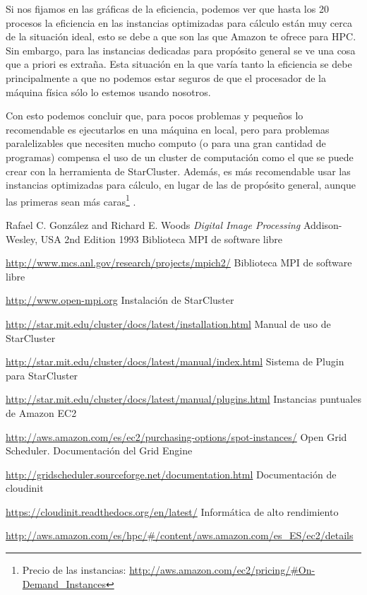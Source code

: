 \documentclass{article}
\begin{document}
	Si nos fijamos en las gráficas de la eficiencia, podemos ver que hasta los 20 procesos la eficiencia en las instancias optimizadas para cálculo están muy cerca de la situación ideal, esto se debe a que son las que Amazon te ofrece para HPC\cite{AmazonHPC}. Sin embargo, para las instancias dedicadas para propósito general se ve una cosa que a priori es extraña. Esta situación en la que varía tanto la eficiencia se debe principalmente a que no podemos estar seguros de que el procesador de la máquina física sólo lo estemos usando nosotros.
	
	Con esto podemos concluir que, para pocos problemas y pequeños lo recomendable es ejecutarlos en una máquina en local, pero para problemas paralelizables que necesiten mucho computo (o para una gran cantidad de programas) compensa el uso de un cluster de computación como el que se puede crear con la herramienta de StarCluster. Además, es más recomendable usar las instancias optimizadas para cálculo, en lugar de las de propósito general, aunque las primeras sean más caras\footnote{Precio de las instancias: \url{http://aws.amazon.com/ec2/pricing/\#On-Demand\_Instances}} .

\clearpage
{\setlength{\parskip}{0mm} \listoftables } %
{\setlength{\parskip}{0mm} \listoffigures} %

\clearpage

\renewcommand{\bibname}{Referencias}
\begin{thebibliography}{99}
Rafael C. González and Richard E. Woods
\emph{Digital Image Processing}
Addison-Wesley, USA
2nd Edition
1993
Biblioteca MPI de software libre

\url{http://www.mcs.anl.gov/research/projects/mpich2/}
Biblioteca MPI de software libre

\url{http://www.open-mpi.org}
Instalación de StarCluster

\url{http://star.mit.edu/cluster/docs/latest/installation.html}
Manual de uso de StarCluster

\url{http://star.mit.edu/cluster/docs/latest/manual/index.html}
Sistema de Plugin para StarCluster

\url{http://star.mit.edu/cluster/docs/latest/manual/plugins.html}
Instancias puntuales de Amazon EC2

\url{http://aws.amazon.com/es/ec2/purchasing-options/spot-instances/}
Open Grid Scheduler. Documentación del Grid Engine

\url{http://gridscheduler.sourceforge.net/documentation.html}
Documentación de cloudinit

\url{https://cloudinit.readthedocs.org/en/latest/}
Informática de alto rendimiento

\url{http://aws.amazon.com/es/hpc/#/content/aws.amazon.com/es_ES/ec2/details}
\end{thebibliography}
\end{document}

